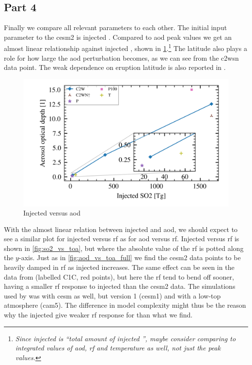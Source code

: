 \documentclass{ametsocV5}
\newcommand{\iso}[1][i]{{#1}njected \ce{SO2}}
\begin{document}
\subsection{Part 4}

Finally we compare all relevant parameters to each other. The initial input parameter to
the \ac{cesm2} is injected . Compared to \ac{aod} peak values we get an almost
linear relationship against \iso{}, shown in \cref{fig:so2_vs_aod}.\footnote{\emph{Since
    \iso{} is ``total amount of \iso{}'', maybe consider comparing to integrated values of
    \ac{aod}, \ac{rf} and temperature as well, not just the peak values.}} The latitude also
plays a role for how large the \ac{aod} perturbation becomes, as we can see from the
\ac{c2wsn} data point. The weak dependence on eruption latitude is also reported in
\citet{marshall2019}.

\begin{figure}[t]
  \begin{center}
    \includegraphics[width=0.95\linewidth]{figures/injection_vs_aod.png}
  \end{center}
  \caption{Injected  versus \ac{aod}}%
  \label{fig:so2_vs_aod}
\end{figure}

With the almost linear relation between injected  and \ac{aod}, we should expect
to see a similar plot for \iso{} versus \ac{rf} as for \ac{aod} versus \ac{rf}. \iso[I]
versus \ac{rf} is shown in \cref{fig:so2_vs_toa}, but where the absolute value of the
\ac{rf} is potted along the \( y \)-axis. Just as in \cref{fig:aod_vs_toa_full} we find
the \ac{cesm2} data points to be heavily damped in \ac{rf} as \iso{} increases. The same
effect can be seen in the data from \citet{ottobliesner2016} (labelled C1C, red points),
but here the \ac{rf} tend to bend off sooner, having a smaller \ac{rf} response to
\iso{} than the \ac{cesm2} data. The simulations used by \citet{ottobliesner2016} was
with \ac{cesm} as well, but version 1 (\ac{cesm1}) and with a low-top atmosphere
(\ac{cam5}). The difference in model complexity might thus be the reason why the \iso{}
give weaker \ac{rf} response for \citet{ottobliesner2016} than what we find.
\end{document}

